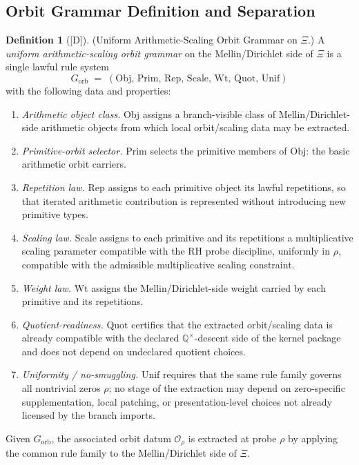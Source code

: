 \documentclass[12pt,oneside]{amsbook}
\theoremstyle{plain}
\theoremstyle{definition}
\newtheorem{definition}[theorem]{Definition}
\theoremstyle{remark}
\newcommand{\status}[1]{\textup{[#1]}}
\begin{document}
\subsection{Orbit Grammar Definition and Separation}

\begin{definition}[\status{D}]\label{def:rh-orbit-grammar}
\textup{(Uniform Arithmetic-Scaling Orbit Grammar on $\Xi$.)}
A \emph{uniform arithmetic-scaling orbit grammar} on the
Mellin/Dirichlet side of $\Xi$ is a single lawful rule system
\[
 G_{\mathrm{orb}}
 \;=\;
 (\mathrm{Obj},\,\mathrm{Prim},\,\mathrm{Rep},\,\mathrm{Scale},\,
 \mathrm{Wt},\,\mathrm{Quot},\,\mathrm{Unif})
\]
with the following data and properties:
\begin{enumerate}[label=\textup{(\arabic*)}]
 \item \emph{Arithmetic object class.} $\mathrm{Obj}$ assigns a
 branch-visible class of Mellin/Dirichlet-side arithmetic objects
 from which local orbit/scaling data may be extracted.
 \item \emph{Primitive-orbit selector.} $\mathrm{Prim}$ selects
 the primitive members of $\mathrm{Obj}$: the basic arithmetic
 orbit carriers.
 \item \emph{Repetition law.} $\mathrm{Rep}$ assigns to each
 primitive object its lawful repetitions, so that iterated
 arithmetic contribution is represented without introducing new
 primitive types.
 \item \emph{Scaling law.} $\mathrm{Scale}$ assigns to each
 primitive and its repetitions a multiplicative scaling parameter
 compatible with the RH probe discipline, uniformly in $\rho$,
 compatible with the admissible multiplicative scaling constraint.
 \item \emph{Weight law.} $\mathrm{Wt}$ assigns the
 Mellin/Dirichlet-side weight carried by each primitive and its
 repetitions.
 \item \emph{Quotient-readiness.} $\mathrm{Quot}$ certifies that
 the extracted orbit/scaling data is already compatible with the
 declared $\mathbb{Q}^\times$-descent side of the kernel package
 and does not depend on undeclared quotient choices.
 \item \emph{Uniformity / no-smuggling.} $\mathrm{Unif}$ requires
 that the same rule family governs all nontrivial zeros $\rho$;
 no stage of the extraction may depend on zero-specific
 supplementation, local patching, or presentation-level choices
 not already licensed by the branch imports.
\end{enumerate}
Given $G_{\mathrm{orb}}$, the associated orbit datum $\mathcal{O}_\rho$
is extracted at probe $\rho$ by applying the common rule family to the
Mellin/Dirichlet side of $\Xi$.
\end{definition}
\end{document}
